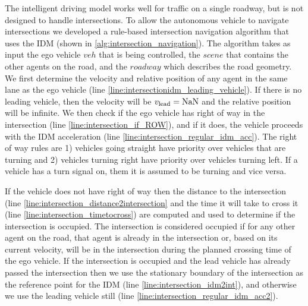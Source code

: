 The intelligent driving model works well for traffic on a single roadway, but is not designed to handle intersections. To allow the autonomous vehicle to navigate intersections we developed a rule-based intersection navigation algorithm that uses the IDM (shown in \cref{alg:intersection_navigation}). The algorithm takes as input the ego vehicle $veh$ that is being controlled, the $scene$ that contains the other agents on the road, and the $roadway$ which describes the road geometry. We first determine the velocity and relative position of any agent in the same lane as the ego vehicle (line \ref{line:intersectionidm_leading_vehicle}). 
If there is no leading vehicle, then the velocity will be $v_{\rm lead} = {\rm NaN}$ and the relative position will be infinite. We then check if the ego vehicle has right of way in the intersection (line \ref{line:intersection_if_ROW}), and if it does, the vehicle proceeds with the IDM acceleration (line \ref{line:intersection_regular_idm_acc}). The right of way rules are 1) vehicles going straight have priority over vehicles that are turning and 2) vehicles turning right have priority over vehicles turning left. If a vehicle has a turn signal on, them it is assumed to be turning and vice versa. 

If the vehicle does not have right of way then the distance to the intersection (line \ref{line:intersection_distance2intersection} and the time it will take to cross it (line \ref{line:intersection_timetocross}) are computed and used to determine if the intersection is occupied. The intersection is considered occupied if for any other agent on the road, that agent is already in the intersection or, based on its current velocity, will be in the intersection during the planned crossing time of the ego vehicle. If the intersection is occupied and the lead vehicle has already passed the intersection then we use the stationary boundary of the intersection as the reference point for the IDM (line \ref{line:intersection_idm2int}), and otherwise we use the leading vehicle still (line \ref{line:intersection_regular_idm_acc2}).


